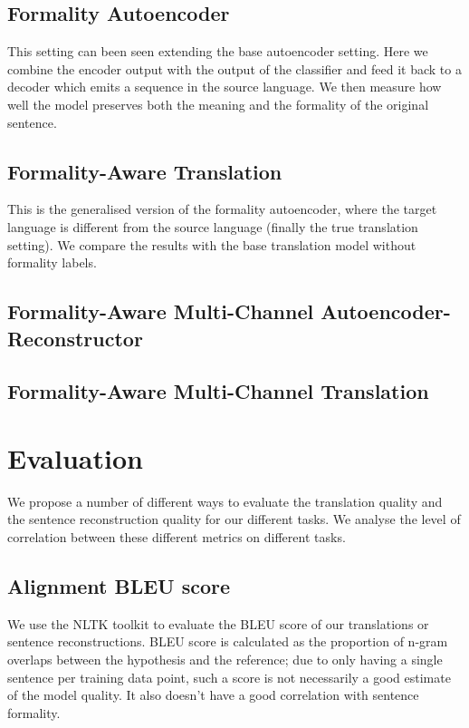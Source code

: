 \documentclass[11pt]{article}
\begin{document}
\subsection{Formality Autoencoder}

This setting can been seen extending the base autoencoder setting. Here we combine the encoder output with the output of the classifier and feed it back to a decoder which emits a sequence in the source language. We then measure how well the model preserves both the meaning and the formality of the original sentence.

\subsection{Formality-Aware Translation}

This is the generalised version of the formality autoencoder, where the target language is different from the source language (finally the true translation setting). We compare the results with the base translation model without formality labels.

\subsection{Formality-Aware Multi-Channel Autoencoder-Reconstructor}

\subsection{Formality-Aware Multi-Channel Translation}

\section{Evaluation}

We propose a number of different ways to evaluate the translation quality and the sentence reconstruction quality for our different tasks. We analyse the level of correlation between these different metrics on different tasks.

\subsection{Alignment BLEU score}

We use the NLTK toolkit \cite{NLTK} to evaluate the BLEU score of our translations or sentence reconstructions. BLEU score is calculated as the proportion of n-gram overlaps between the hypothesis and the reference; due to only having a single sentence per training data point, such a score is not necessarily a good estimate of the model quality. It also doesn't have a good correlation with sentence formality.
\end{document}

